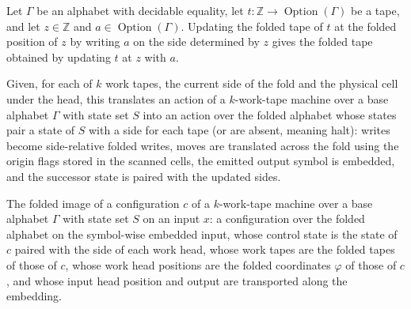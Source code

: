 \begin{lemma}
\label{Turing.FinTM.foldTape_update}
\leanok
{}
Let $\Gamma$ be an alphabet with decidable equality, let
$t\colon\mathbb{Z}\to\operatorname{Option}(\Gamma)$ be a tape, and let $z\in\mathbb{Z}$
and $a\in\operatorname{Option}(\Gamma)$. Updating the folded tape of $t$ at the folded
position of $z$ by writing $a$ on the side determined by $z$ gives the folded tape
obtained by updating $t$ at $z$ with $a$.
\end{lemma}

\begin{definition}
\label{Turing.FinTM.foldAction}
\leanok
{}
Given, for each of $k$ work tapes, the current side of the fold and the physical
cell under the head, this translates an action of a $k$-work-tape machine over a
base alphabet $\Gamma$ with state set $S$ into an action over the folded alphabet
whose states pair a state of $S$ with a side for each tape (or are absent, meaning
halt): writes become side-relative folded writes, moves are translated across the
fold using the origin flags stored in the scanned cells, the emitted output symbol
is embedded, and the successor state is paired with the updated sides.
\end{definition}

\begin{definition}
\label{Turing.FinTM.foldCfg}
\leanok
{}
The folded image of a configuration $c$ of a $k$-work-tape machine over a base
alphabet $\Gamma$ with state set $S$ on an input $x$: a configuration over the
folded alphabet on the symbol-wise embedded input, whose control state is the state
of $c$ paired with the side of each work head, whose work tapes are the folded
tapes of those of $c$, whose work head positions are the folded coordinates
$\varphi$ of those of $c$, and whose input head position and output are transported
along the embedding.
\end{definition}


